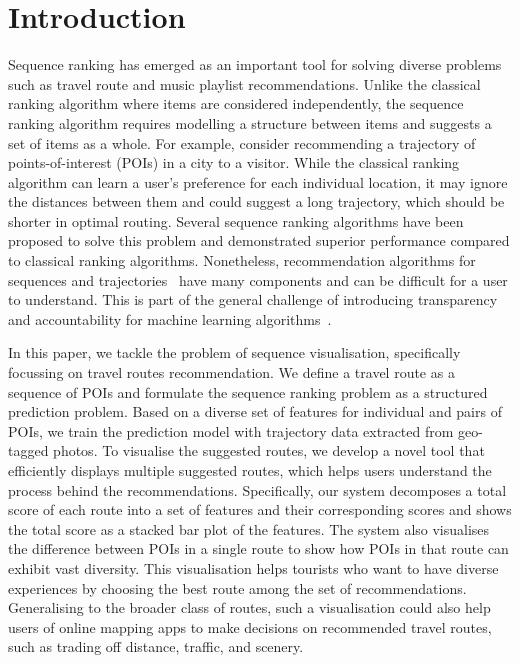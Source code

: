 
\section{Introduction}
Sequence ranking has emerged as an important tool for solving diverse problems such as travel route and music playlist recommendations. 
Unlike the classical ranking algorithm where items are considered independently, the sequence ranking algorithm requires modelling a structure between items and suggests a set of items as a whole. 
For example, consider recommending a trajectory of points-of-interest (POIs) in a city to a visitor. 
While the classical ranking algorithm can learn a user's preference for each individual location, it may ignore the distances between them and could suggest a long trajectory, which should be shorter in optimal routing. 
Several sequence ranking algorithms have been proposed to solve this problem and demonstrated superior performance compared to classical ranking algorithms. 
Nonetheless, recommendation algorithms for sequences and trajectories~\cite{chen2016learning,chen2017SR} have many components and can be difficult for a user to understand. This is part of the general challenge of introducing transparency and accountability for machine learning algorithms~\cite{fatml}. 

In this paper, we tackle the problem of sequence visualisation, specifically focussing on travel routes recommendation. 
We define a travel route as a sequence of POIs and formulate the sequence ranking problem as a structured prediction problem. 
Based on a diverse set of features for individual and pairs of POIs, we train the prediction model with trajectory data extracted from geo-tagged photos. 
To visualise the suggested routes, we develop a novel tool that efficiently displays multiple suggested routes, which helps users understand the process behind the recommendations.
Specifically, our system decomposes a total score of each route into a set of features and their corresponding scores and shows the total score as a stacked bar plot of the features.
The system also visualises the difference between POIs in a single route to show how POIs in that route can exhibit vast diversity. 
This visualisation helps tourists who want to have diverse experiences by choosing the best route among the set of recommendations. Generalising to the broader class of routes, such a visualisation could also help users of online mapping apps to make decisions on recommended travel routes, such as trading off distance, traffic, and scenery. 
